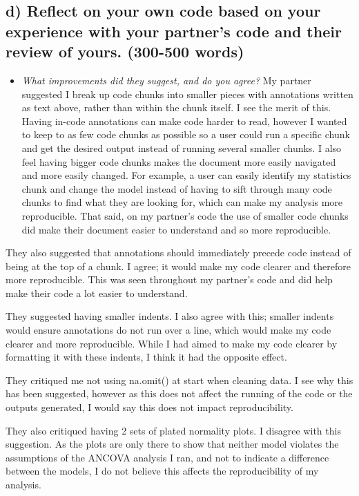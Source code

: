\documentclass[
]{article}
\providecommand{\tightlist}{%
  \setlength{\itemsep}{0pt}\setlength{\parskip}{0pt}}
\begin{document}
\subsection{d) Reflect on your own code based on your experience with
your partner's code and their review of yours. (300-500
words)}\label{d-reflect-on-your-own-code-based-on-your-experience-with-your-partners-code-and-their-review-of-yours.-300-500-words}

\begin{itemize}
\tightlist
\item
  \emph{What improvements did they suggest, and do you agree?} My
  partner suggested I break up code chunks into smaller pieces with
  annotations written as text above, rather than within the chunk
  itself. I see the merit of this. Having in-code annotations can make
  code harder to read, however I wanted to keep to as few code chunks as
  possible so a user could run a specific chunk and get the desired
  output instead of running several smaller chunks. I also feel having
  bigger code chunks makes the document more easily navigated and more
  easily changed. For example, a user can easily identify my statistics
  chunk and change the model instead of having to sift through many code
  chunks to find what they are looking for, which can make my analysis
  more reproducible. That said, on my partner's code the use of smaller
  code chunks did make their document easier to understand and so more
  reproducible.
\end{itemize}

They also suggested that annotations should immediately precede code
instead of being at the top of a chunk. I agree; it would make my code
clearer and therefore more reproducible. This was seen throughout my
partner's code and did help make their code a lot easier to understand.

They suggested having smaller indents. I also agree with this; smaller
indents would ensure annotations do not run over a line, which would
make my code clearer and more reproducible. While I had aimed to make my
code clearer by formatting it with these indents, I think it had the
opposite effect.

They critiqued me not using na.omit() at start when cleaning data. I see
why this has been suggested, however as this does not affect the running
of the code or the outputs generated, I would say this does not impact
reproducibility.

They also critiqued having 2 sets of plated normality plots. I disagree
with this suggestion. As the plots are only there to show that neither
model violates the assumptions of the ANCOVA analysis I ran, and not to
indicate a difference between the models, I do not believe this affects
the reproducibility of my analysis.
\end{document}
